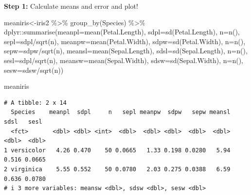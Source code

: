 \documentclass[
  letterpaper,
  DIV=11,
  numbers=noendperiod]{scrartcl}
\newenvironment{Shaded}{\begin{snugshade}}{\end{snugshade}}
\newcommand{\AttributeTok}[1]{\textcolor[rgb]{0.40,0.45,0.13}{#1}}
\newcommand{\FunctionTok}[1]{\textcolor[rgb]{0.28,0.35,0.67}{#1}}
\newcommand{\NormalTok}[1]{\textcolor[rgb]{0.00,0.23,0.31}{#1}}
\newcommand{\OtherTok}[1]{\textcolor[rgb]{0.00,0.23,0.31}{#1}}
\newcommand{\SpecialCharTok}[1]{\textcolor[rgb]{0.37,0.37,0.37}{#1}}
\begin{document}
\textbf{Step 1:} Calculate means and error and plot!

\begin{Shaded}
\begin{Highlighting}[]
\NormalTok{meaniris}\OtherTok{\textless{}{-}}\NormalTok{iris2 }\SpecialCharTok{\%\textgreater{}\%}
  \FunctionTok{group\_by}\NormalTok{(Species) }\SpecialCharTok{\%\textgreater{}\%}
\NormalTok{  dplyr}\SpecialCharTok{::}\FunctionTok{summarise}\NormalTok{(}\AttributeTok{meanpl=}\FunctionTok{mean}\NormalTok{(Petal.Length), }\AttributeTok{sdpl=}\FunctionTok{sd}\NormalTok{(Petal.Length), }\AttributeTok{n=}\FunctionTok{n}\NormalTok{(), }\AttributeTok{sepl=}\NormalTok{sdpl}\SpecialCharTok{/}\FunctionTok{sqrt}\NormalTok{(n), }\AttributeTok{meanpw=}\FunctionTok{mean}\NormalTok{(Petal.Width), }\AttributeTok{sdpw=}\FunctionTok{sd}\NormalTok{(Petal.Width), }\AttributeTok{n=}\FunctionTok{n}\NormalTok{(), }\AttributeTok{sepw=}\NormalTok{sdpw}\SpecialCharTok{/}\FunctionTok{sqrt}\NormalTok{(n), }\AttributeTok{meansl=}\FunctionTok{mean}\NormalTok{(Sepal.Length), }\AttributeTok{sdsl=}\FunctionTok{sd}\NormalTok{(Sepal.Length), }\AttributeTok{n=}\FunctionTok{n}\NormalTok{(), }\AttributeTok{sesl=}\NormalTok{sdpl}\SpecialCharTok{/}\FunctionTok{sqrt}\NormalTok{(n), }\AttributeTok{meansw=}\FunctionTok{mean}\NormalTok{(Sepal.Width), }\AttributeTok{sdsw=}\FunctionTok{sd}\NormalTok{(Sepal.Width), }\AttributeTok{n=}\FunctionTok{n}\NormalTok{(), }\AttributeTok{sesw=}\NormalTok{sdsw}\SpecialCharTok{/}\FunctionTok{sqrt}\NormalTok{(n))}

\NormalTok{meaniris}
\end{Highlighting}
\end{Shaded}

\begin{verbatim}
# A tibble: 2 x 14
  Species    meanpl  sdpl     n   sepl meanpw  sdpw   sepw meansl  sdsl   sesl
  <fct>       <dbl> <dbl> <int>  <dbl>  <dbl> <dbl>  <dbl>  <dbl> <dbl>  <dbl>
1 versicolor   4.26 0.470    50 0.0665   1.33 0.198 0.0280   5.94 0.516 0.0665
2 virginica    5.55 0.552    50 0.0780   2.03 0.275 0.0388   6.59 0.636 0.0780
# i 3 more variables: meansw <dbl>, sdsw <dbl>, sesw <dbl>
\end{verbatim}

\hfill\break
\end{document}
